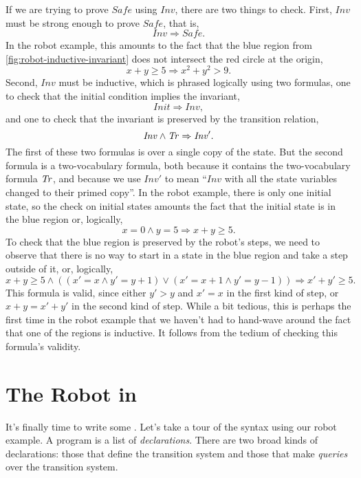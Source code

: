 If we are trying to prove $\mathit{Safe}$ using $\mathit{Inv}$,
  there are two things to check.
First, $\mathit{Inv}$ must be strong enough
  to prove $\mathit{Safe}$,
  that is,
\[
  \mathit{Inv} \Rightarrow \mathit{Safe}.
\]
In the robot example, this amounts to the fact that
  the blue region from \cref{fig:robot-inductive-invariant}
  does not intersect the red circle at the origin,
\[
  x + y \ge 5 \Rightarrow x^2 + y^2 > 9.
\]
Second, $\mathit{Inv}$ must be inductive,
  which is phrased logically using two formulas,
one to check that the initial condition implies the invariant,
\[
  \mathit{Init} \Rightarrow \mathit{Inv},
\]
and one to check that the invariant is preserved by the transition relation,
\[
  \mathit{Inv} \land \mathit{Tr} \Rightarrow \mathit{Inv}'.
\]
The first of these two formulas is over a single copy of the state.
But the second formula is a two-vocabulary formula,
  both because it contains the two-vocabulary formula $\mathit{Tr}$,
  and because we use $\mathit{Inv}'$ to mean ``$\mathit{Inv}$
  with all the state variables changed to their primed copy''.
In the robot example, there is only one initial state,
  so the check on initial states amounts the fact that
  the initial state is in the blue region
  or, logically,
\[
  x = 0 \land y = 5 \Rightarrow x + y \ge 5.
\]
To check that the blue region is preserved by the robot's steps,
  we need to observe that there is no way to start in a state in the blue region
  and take a step outside of it,
  or, logically,
\[
  x + y \ge 5 \land ((x' = x \land y' = y + 1) \lor
                     (x' = x + 1 \land y' = y - 1)) \Rightarrow
  x' + y' \ge 5.
\]
This formula is valid, since
  either $y' > y$ and $x' = x$ in the first kind of step,
  or $x + y = x' + y'$ in the second kind of step.
While a bit tedious, this is perhaps the first time in the robot example
  that we haven't had to hand-wave around
  the fact that one of the regions is inductive.
It follows from the tedium of checking this formula's validity.

\section{The Robot in \mypyvy}

It's finally time to write some \mypyvy.
Let's take a tour of the syntax using our robot example.
A \mypyvy program is a list of \emph{declarations}.
There are two broad kinds of declarations:
  those that define the transition system
  and those that make \emph{queries} over the transition system.

